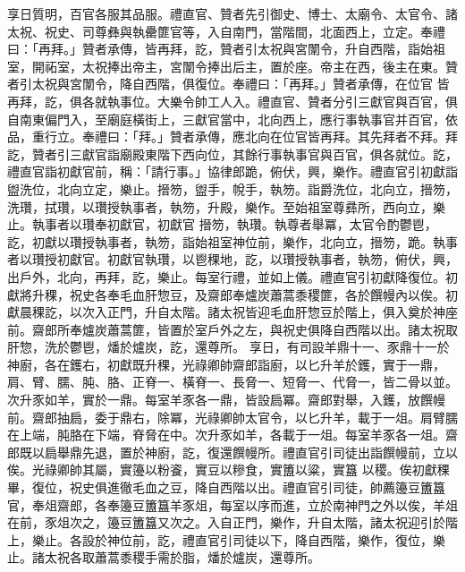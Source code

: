 \begin{pinyinscope}
 享日質明，百官各服其品服。禮直官、贊者先引御史、博士、太廟令、太官令、諸太祝、祝史、司尊彝與執罍篚官等，入自南門，當階間，北面西上，立定。奉禮曰：「再拜。」贊者承傳，皆再拜，訖，贊者引太祝與宮闈令，升自西階，詣始祖室，開祏室，太祝捧出帝主，宮闈令捧出后主，置於座。帝主在西，後主在東。贊者引太祝與宮闈令，降自西階，俱復位。奉禮曰：「再拜。」贊者承傳，在位官
 皆再拜，訖，俱各就執事位。大樂令帥工人入。禮直官、贊者分引三獻官與百官，俱自南東偏門入，至廟庭橫街上，三獻官當中，北向西上，應行事執事官并百官，依品，重行立。奉禮曰：「拜。」贊者承傳，應北向在位官皆再拜。其先拜者不拜。拜訖，贊者引三獻官詣廟殿東階下西向位，其餘行事執事官與百官，俱各就位。訖，禮直官詣初獻官前，稱：「請行事。」協律郎跪，俯伏，興，樂作。禮直官引初獻詣盥洗位，北向立定，樂止。搢笏，盥手，帨手，執笏。詣爵洗位，北向立，搢笏，洗瓚，拭瓚，以瓚授執事者，執笏，升殿，樂作。至始祖室尊彞所，西向立，樂止。執事者以瓚奉初獻官，初獻官
 搢笏，執瓚。執尊者舉冪，太官令酌鬱鬯，訖，初獻以瓚授執事者，執笏，詣始祖室神位前，樂作，北向立，搢笏，跪。執事者以瓚授初獻官。初獻官執瓚，以鬯稞地，訖，以瓚授執事者，執笏，俯伏，興，出戶外，北向，再拜，訖，樂止。每室行禮，並如上儀。禮直官引初獻降復位。初獻將升稞，祝史各奉毛血肝惣豆，及齋郎奉爐炭蕭蒿黍稷篚，各於饌幔內以俟。初獻晨稞訖，以次入正門，升自太階。諸太祝皆迎毛血肝惣豆於階上，俱入奠於神座前。齋郎所奉爐炭蕭蒿篚，皆置於室戶外之左，與祝史俱降自西階以出。諸太祝取肝惣，洗於鬱鬯，燔於爐炭，訖，還尊所。
 享日，有司設羊鼎十一、豕鼎十一於神廚，各在鑊右，初獻既升稞，光祿卿帥齋郎詣廚，以匕升羊於鑊，實于一鼎，肩、臂、臑、肫、胳、正脊一、橫脊一、長脅一、短脅一、代脅一，皆二骨以並。次升豕如羊，實於一鼎。每室羊豕各一鼎，皆設扃冪。齋郎對舉，入鑊，放饌幔前。齋郎抽扃，委于鼎右，除冪，光祿卿帥太官令，以匕升羊，載于一俎。肩臂臑在上端，肫胳在下端，脊脅在中。次升豕如羊，各載于一俎。每室羊豕各一俎。齋郎既以扃舉鼎先退，置於神廚，訖，復還饌幔所。禮直官引司徒出詣饌幔前，立以俟。光祿卿帥其屬，實籩以粉餈，實豆以糝食，實簠以粱，實簋
 以稷。俟初獻稞畢，復位，祝史俱進徹毛血之豆，降自西階以出。禮直官引司徒，帥薦籩豆簠簋官，奉俎齋郎，各奉籩豆簠簋羊豕俎，每室以序而進，立於南神門之外以俟，羊俎在前，豕俎次之，籩豆簠簋又次之。入自正門，樂作，升自太階，諸太祝迎引於階上，樂止。各設於神位前，訖，禮直官引司徒以下，降自西階，樂作，復位，樂止。諸太祝各取蕭蒿黍稷手需於脂，燔於爐炭，還尊所。




\end{pinyinscope}
